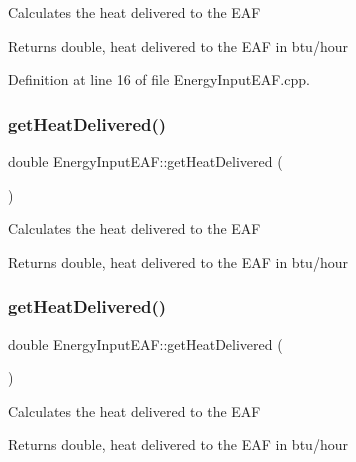 Calculates the heat delivered to the E\+AF

\begin{DoxyReturn}{Returns}
double, heat delivered to the E\+AF in btu/hour 
\end{DoxyReturn}


Definition at line 16 of file Energy\+Input\+E\+A\+F.\+cpp.

\mbox{\label{class_energy_input_e_a_f_ad1916eba02c6036a603cf34420169911}} 
\subsubsection{\texorpdfstring{get\+Heat\+Delivered()}{getHeatDelivered()}\hspace{0.1cm}{\footnotesize\ttfamily [2/3]}}
{\footnotesize\ttfamily double Energy\+Input\+E\+A\+F\+::get\+Heat\+Delivered (\begin{DoxyParamCaption}{ }\end{DoxyParamCaption})}

Calculates the heat delivered to the E\+AF

\begin{DoxyReturn}{Returns}
double, heat delivered to the E\+AF in btu/hour 
\end{DoxyReturn}
\mbox{\label{class_energy_input_e_a_f_ad1916eba02c6036a603cf34420169911}} 
\subsubsection{\texorpdfstring{get\+Heat\+Delivered()}{getHeatDelivered()}\hspace{0.1cm}{\footnotesize\ttfamily [3/3]}}
{\footnotesize\ttfamily double Energy\+Input\+E\+A\+F\+::get\+Heat\+Delivered (\begin{DoxyParamCaption}{ }\end{DoxyParamCaption})}

Calculates the heat delivered to the E\+AF

\begin{DoxyReturn}{Returns}
double, heat delivered to the E\+AF in btu/hour 
\end{DoxyReturn}
\mbox{\label{class_energy_input_e_a_f_a44b4a70dcc3e5f0bf9d33eabd6158b2f}} 
